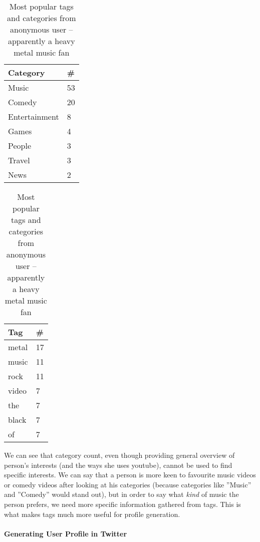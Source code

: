 \begin{table}[ht]
\begin{minipage}[b]{0.5\linewidth}\centering

\begin{tabular}{| l | l |}
Category & \# \\ \hline
Music & 53 \\
Comedy & 20 \\
Entertainment & 8 \\
Games & 4 \\
People & 3 \\
Travel & 3 \\
News & 2 \\
\end{tabular}

\end{minipage}
\hspace{0.5cm}
\begin{minipage}[b]{0.5\linewidth}
\centering

\begin{tabular}{| l | l |}
Tag & \# \\ \hline
metal & 17 \\
music & 11 \\
rock & 11 \\
video & 7 \\
the & 7 \\
black & 7 \\
of & 7 \\
\end{tabular}

\end{minipage}

\caption{Most popular tags and categories from anonymous user -- apparently a
heavy metal music fan}
\end{table}

We can see that category count, even though providing general overview of
person's interests (and the ways she uses youtube), cannot be used to find
specific interests. We can say that a person is more keen to
favourite music videos or comedy videos after looking at his categories
(because categories like ''Music'' and ''Comedy'' would stand out), but in
order to say what \textit{kind} of music the person prefers, we need more specific
information gathered from \eg tags. This is what makes tags much more useful
for profile generation.

\paragraph{Generating User Profile in Twitter}

